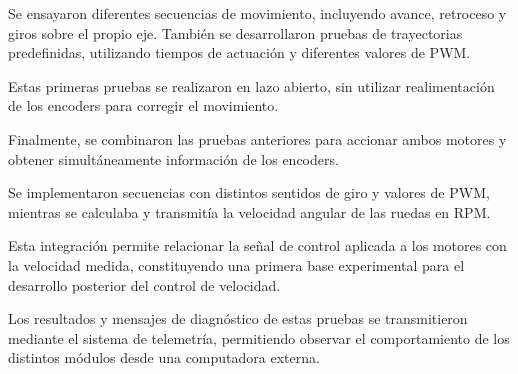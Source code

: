 \begin{description}
	Se ensayaron diferentes secuencias de movimiento, incluyendo avance, retroceso y giros sobre el propio eje. También se desarrollaron pruebas de trayectorias predefinidas, utilizando tiempos de actuación y diferentes valores de PWM.
	
	Estas primeras pruebas se realizaron en lazo abierto, sin utilizar realimentación de los encoders para corregir el movimiento.
	
	\item[Integración de motores y encoders:]
	Finalmente, se combinaron las pruebas anteriores para accionar ambos motores y obtener simultáneamente información de los encoders.
	
	Se implementaron secuencias con distintos sentidos de giro y valores de PWM, mientras se calculaba y transmitía la velocidad angular de las ruedas en RPM.
	
	Esta integración permite relacionar la señal de control aplicada a los motores con la velocidad medida, constituyendo una primera base experimental para el desarrollo posterior del control de velocidad.
	
\end{description}

Los resultados y mensajes de diagnóstico de estas pruebas se transmitieron mediante el sistema de telemetría, permitiendo observar el comportamiento de los distintos módulos desde una computadora externa.
